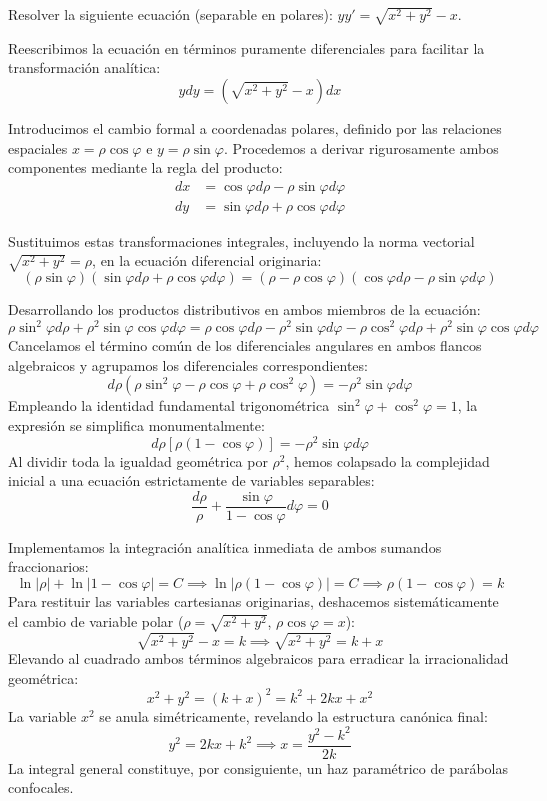 \begin{ejercicio}
Resolver la siguiente ecuación (separable en polares): $yy' = \sqrt{x^2 + y^2} - x$.
\end{ejercicio}

\begin{tcolorbox}
Reescribimos la ecuación en términos puramente diferenciales para facilitar la transformación analítica:
$$ y dy = (\sqrt{x^2 + y^2} - x)dx $$

Introducimos el cambio formal a coordenadas polares, definido por las relaciones espaciales $x = \rho \cos\varphi$ e $y = \rho \sin\varphi$. Procedemos a derivar rigurosamente ambos componentes mediante la regla del producto:
\begin{align*}
    dx &= \cos\varphi d\rho - \rho \sin\varphi d\varphi \\
    dy &= \sin\varphi d\rho + \rho \cos\varphi d\varphi
\end{align*}

Sustituimos estas transformaciones integrales, incluyendo la norma vectorial $\sqrt{x^2+y^2} = \rho$, en la ecuación diferencial originaria:
$$ (\rho \sin\varphi)(\sin\varphi d\rho + \rho \cos\varphi d\varphi) = (\rho - \rho \cos\varphi)(\cos\varphi d\rho - \rho \sin\varphi d\varphi) $$

Desarrollando los productos distributivos en ambos miembros de la ecuación:
$$ \rho \sin^2\varphi d\rho + \rho^2 \sin\varphi \cos\varphi d\varphi = \rho \cos\varphi d\rho - \rho^2 \sin\varphi d\varphi - \rho \cos^2\varphi d\rho + \rho^2 \sin\varphi \cos\varphi d\varphi $$
Cancelamos el término común de los diferenciales angulares en ambos flancos algebraicos y agrupamos los diferenciales correspondientes:
$$ d\rho (\rho \sin^2\varphi - \rho \cos\varphi + \rho \cos^2\varphi) = - \rho^2 \sin\varphi d\varphi $$
Empleando la identidad fundamental trigonométrica $\sin^2\varphi + \cos^2\varphi = 1$, la expresión se simplifica monumentalmente:
$$ d\rho [\rho(1 - \cos\varphi)] = - \rho^2 \sin\varphi d\varphi $$
Al dividir toda la igualdad geométrica por $\rho^2$, hemos colapsado la complejidad inicial a una ecuación estrictamente de variables separables:
$$ \frac{d\rho}{\rho} + \frac{\sin\varphi}{1 - \cos\varphi} d\varphi = 0 $$

Implementamos la integración analítica inmediata de ambos sumandos fraccionarios:
$$ \ln|\rho| + \ln|1 - \cos\varphi| = C \implies \ln|\rho(1 - \cos\varphi)| = C \implies \rho(1 - \cos\varphi) = k $$
Para restituir las variables cartesianas originarias, deshacemos sistemáticamente el cambio de variable polar ($\rho = \sqrt{x^2+y^2}$, $\rho\cos\varphi = x$):
$$ \sqrt{x^2 + y^2} - x = k \implies \sqrt{x^2 + y^2} = k + x $$
Elevando al cuadrado ambos términos algebraicos para erradicar la irracionalidad geométrica:
$$ x^2 + y^2 = (k + x)^2 = k^2 + 2kx + x^2 $$
La variable $x^2$ se anula simétricamente, revelando la estructura canónica final:
$$ y^2 = 2kx + k^2 \implies x = \frac{y^2 - k^2}{2k} $$
La integral general constituye, por consiguiente, un haz paramétrico de parábolas confocales.


\end{tcolorbox}

